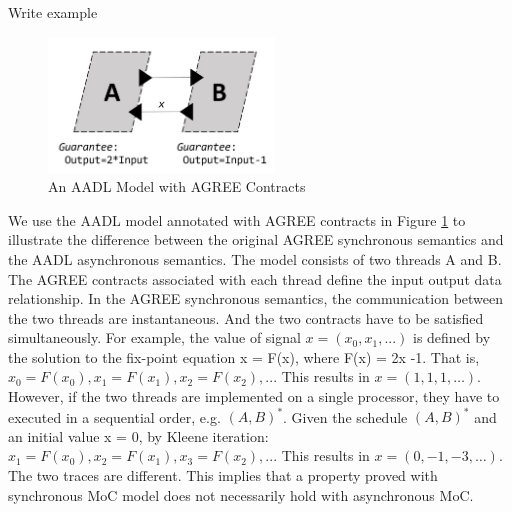 Write example


\begin{figure}[ht!]
\centering
\includegraphics[width=60mm]{motivation.jpg}
\caption{An AADL Model with AGREE Contracts\label{motivation}}
\end{figure}

We use the AADL model annotated with AGREE contracts in Figure \ref{motivation} to illustrate the difference between the original AGREE synchronous semantics and the AADL asynchronous semantics. The model consists of two threads A and B. The AGREE contracts associated with each thread define the input output data relationship. In the AGREE synchronous semantics, the communication between the two threads are instantaneous. And the two contracts have to be satisfied simultaneously. For example, the value of signal $x = (x_0, x_1, ...)$ is defined by the solution to the fix-point equation x = F(x), where F(x) = 2x -1. That is, $x_0 = F(x_0), x_1 = F(x_1), x_2 = F(x_2), ...$ This results in $x = (1,1,1,…)$. However, if the two threads are implemented on a single processor, they have to executed in a sequential order, e.g. $(A,B)^*$. 
Given the schedule $(A,B)^*$ and an initial value x = 0,  by Kleene iteration: $x_1 = F(x_0), x_2 = F(x_1), x_3 = F(x_2),...$ This results in $x = (0,-1,-3,…)$. The two traces are different. This implies that a property proved with synchronous MoC model does not necessarily hold with asynchronous MoC. 
